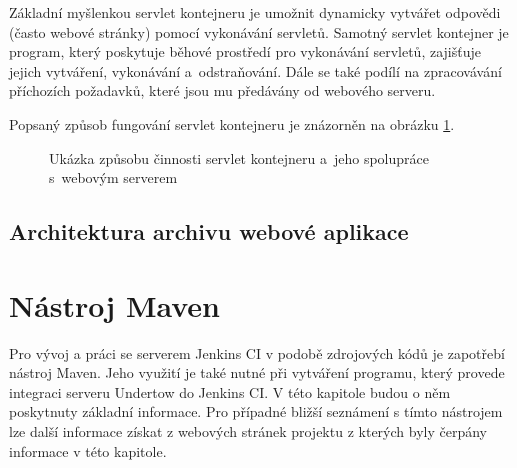             Základní myšlenkou servlet kontejneru je umožnit dynamicky vytvářet odpovědi (často webové stránky)
            pomocí vykonávání servletů. Samotný servlet kontejner je program, který poskytuje běhové prostředí pro vykonávání servletů,
            zajišťuje jejich vytváření, vykonávání a~odstraňování. Dále se také podílí na zpracovávání příchozích požadavků, které jsou
            mu předávány od webového serveru. 

            Popsaný způsob fungování servlet kontejneru je znázorněn na obrázku \ref{imgServlet}.
            \begin{figure}[ht]
                \begin{center}
                    \caption{Ukázka způsobu činnosti servlet kontejneru a~jeho spolupráce s~webovým serverem \cite{webserverVsServletPage}}
                    \label{imgServlet}
                \end{center}
            \end{figure}   %

        \subsection{Architektura archivu webové aplikace}


         
    \section{Nástroj Maven} \label{maven}
        Pro vývoj a práci se serverem Jenkins CI v podobě zdrojových kódů je zapotřebí nástroj Maven. 
        Jeho využití je také nutné při vytváření programu, který provede integraci serveru Undertow do Jenkins CI. 
        V této kapitole budou o něm poskytnuty základní informace. Pro případné bližší
        seznámení s tímto nástrojem lze další informace získat z webových stránek projektu \cite{mavenWeb}
        z kterých byly čerpány informace v této kapitole. 
        
